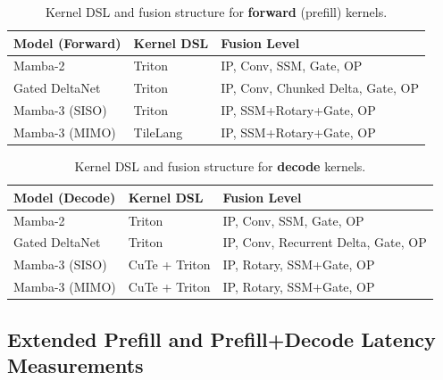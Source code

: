 \documentclass{article}
\newcommand{\torch}[1]{\textcolor{TorchCol}{#1}}
\newcommand{\triton}[1]{\textcolor{TritonCol}{#1}}
\newcommand{\cute}[1]{\textcolor{CuTeCol}{#1}}
\newcommand{\tilelang}[1]{\textcolor{TileLangCol}{#1}}
\theoremstyle{plain}
\theoremstyle{definition}
\theoremstyle{remark}
\begin{document}
\begin{table}[h!]
\centering
\caption{Kernel DSL and fusion structure for \textbf{forward} (prefill) kernels.}
\label{tab:kernel-fusion-forward}
\begin{tabular}{l l p{7.5cm}}
\toprule
\textbf{Model (Forward)} & \textbf{Kernel DSL} & \textbf{Fusion Level} \\
\midrule
Mamba-2        
& Triton 
& \torch{IP}, \triton{Conv}, \triton{SSM}, \triton{Gate}, \torch{OP} \\[3pt]

Gated DeltaNet 
& Triton 
& \torch{IP}, \triton{Conv}, \triton{Chunked Delta}, \triton{Gate}, \torch{OP} \\[3pt]

Mamba-3 (SISO) 
& Triton 
& \torch{IP}, \triton{SSM+Rotary+Gate}, \torch{OP} \\[3pt]

Mamba-3 (MIMO) 
& TileLang 
& \torch{IP}, \tilelang{SSM+Rotary+Gate}, \torch{OP} \\
\bottomrule
\end{tabular}
\end{table}

\begin{table}[h!]
\centering
\caption{Kernel DSL and fusion structure for \textbf{decode} kernels.}
\label{tab:kernel-fusion-decode}
\begin{tabular}{l l p{7.5cm}}
\toprule
\textbf{Model (Decode)} & \textbf{Kernel DSL} & \textbf{Fusion Level} \\
\midrule
Mamba-2        
& Triton        
& \torch{IP}, \triton{Conv}, \triton{SSM}, \triton{Gate}, \torch{OP} \\[3pt]

Gated DeltaNet 
& Triton        
& \torch{IP}, \triton{Conv}, \triton{Recurrent Delta}, \triton{Gate}, \torch{OP} \\[3pt]

Mamba-3 (SISO) 
& CuTe + Triton 
& \torch{IP}, \triton{Rotary}, \cute{SSM+Gate}, \torch{OP} \\[3pt]

Mamba-3 (MIMO) 
& CuTe + Triton 
& \torch{IP}, \triton{Rotary}, \cute{SSM+Gate}, \torch{OP} \\
\bottomrule
\end{tabular}
\end{table}

\subsection{Extended Prefill and Prefill+Decode Latency Measurements}
\end{document}
